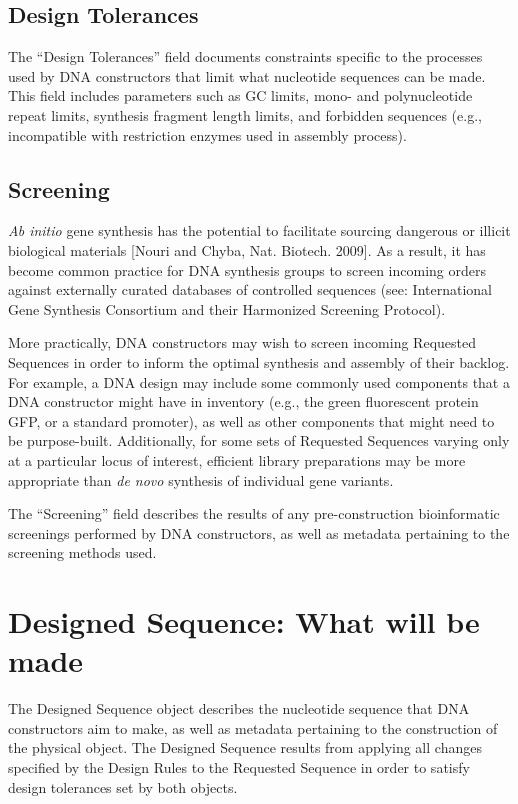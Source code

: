 \documentclass[12pt,letterpaper,english]{article}
\begin{document}
\subsection{Design Tolerances}
The “Design Tolerances” field documents constraints specific to the processes used by DNA constructors that limit what nucleotide sequences can be made. This field includes parameters such as GC limits, mono- and polynucleotide repeat limits, synthesis fragment length limits, and forbidden sequences (e.g., incompatible with restriction enzymes used in assembly process). \par

\subsection{Screening}
\textit{Ab initio} gene synthesis has the potential to facilitate sourcing dangerous or illicit biological materials \cite{} [Nouri and Chyba, Nat. Biotech. 2009]. As a result, it has become common practice for DNA synthesis groups to screen incoming orders against externally curated databases of controlled sequences (see: International Gene Synthesis Consortium and their Harmonized Screening Protocol). \par
More practically, DNA constructors may wish to screen incoming Requested Sequences in order to inform the optimal synthesis and assembly of their backlog. For example, a DNA design may include some commonly used components that a DNA constructor might have in inventory (e.g., the green fluorescent protein GFP, or a standard promoter), as well as other components that might need to be purpose-built. Additionally, for some sets of Requested Sequences varying only at a particular locus of interest, efficient library preparations may be more appropriate than \textit{de novo} synthesis of individual gene variants. \par
The “Screening” field describes the results of any pre-construction bioinformatic screenings performed by DNA constructors, as well as metadata pertaining to the screening methods used. \par

\section{Designed Sequence: What will be made}
The Designed Sequence object describes the nucleotide sequence that DNA constructors aim to make, as well as metadata pertaining to the construction of the physical object. The Designed Sequence results from applying all changes specified by the Design Rules to the Requested Sequence in order to satisfy design tolerances set by both objects. \par
\end{document}
